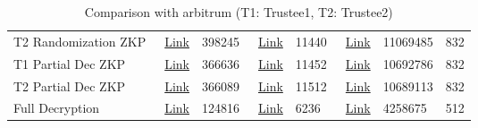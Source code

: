 \begin{table}[]
\begin{tabular}{|l|l|l|l|l|l|l|l|}
		  T2 Randomization ZKP & ~\href{https://kovan.etherscan.io/tx/0x6dd05a76c771089144583a685c2fb9a6b566a626aa86b568230faf83268fdd92}{Link}& 398245 & ~\href{https://kovan.etherscan.io/tx/0xd790b2edd8800a183068b3253d7e5b00e57d850bce8d9b8572494539b58c7e3c}{Link} &11440& ~\href{https://explorer.offchainlabs.com/#/tx/0x71535a6b6d0124cbd61a4993e5e831cc4ba151eec60b1c368a79686f3f5bc1f4}{Link} & 11069485 & 832 \\  \cline{1-8}
	
		 T1 Partial Dec ZKP &~\href{https://kovan.etherscan.io/tx/0x477b3e6b645cc672bbbe99ea3e7fa227962a3e1222071c266442a5ab8366e1bb}{Link} &366636 & ~\href{https://kovan.etherscan.io/tx/0xdd0ffc715dc5733bee36fd99d51898cf978de27ece76777099c4570929039a25}{Link} & 11452& ~\href{https://explorer.offchainlabs.com/#/tx/0x9f7fba14177790f6dad6ad9bb0ec3017803b466a27182768b11163162a3961c3}{Link} & 10692786& 832\\  \cline{1-8}

	 T2 Partial Dec ZKP &~\href{https://kovan.etherscan.io/tx/0x59a6282197cbd71b2c25cd5f3547b41ca7baf33322088f35273c97fce5cf8b56}{Link} &366089 & ~\href{https://kovan.etherscan.io/tx/0xb2a71505f192dd2119634ddd69070c52eb3a3d993aeb632ea8f823eb62f26e84}{Link} & 11512&  ~\href{https://explorer.offchainlabs.com/#/tx/0x724578f12940ebd653613c5037576540ce129ef277e4db67aff135711327e8f8}{Link} & 10689113& 832\\  \cline{1-8}
	
		Full Decryption & ~\href{https://kovan.etherscan.io/tx/0x172804db2abcef274dedfad8f31f84a0bb26c87826842589537f1d511402b282}{Link} & 124816 &  ~\href{https://kovan.etherscan.io/tx/0x10788165eacbbe25066c163fa0cf7a5af07da32c05af001d0f05ad8946974c6e}{Link}& 6236& ~\href{https://explorer.offchainlabs.com/#/tx/0x3515cc045805f2f9af9f378f4725ab4845679ca15ecd2e86758f8d53eb9a7353}{Link} & 4258675 & 512\\  \hline
	\end{tabular}
	\caption{Comparison with arbitrum (T1: Trustee1, T2: Trustee2)} 
\end{table}
